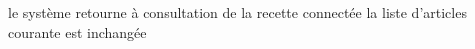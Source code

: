 \exception 
{} 
  \etape le système retourne à consultation de la recette connectée
\stopcondition
\postcondition la liste d'articles courante est inchangée
\stopalternatif
\stopCU
